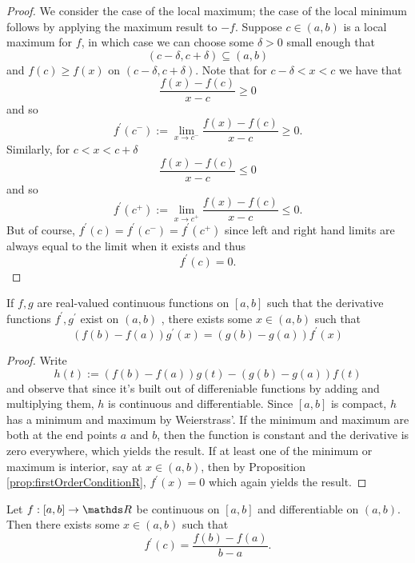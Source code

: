 \begin{proof}
We consider the case of the local maximum; the case of the local minimum
follows by applying the maximum result to $-f.$ Suppose $c\in\left(a,b\right)$
is a local maximum for $f$, in which case we can choose some $\delta>0$
small enough that 
\[
\left(c-\delta,c+\delta\right)\subseteq\left(a,b\right)
\]
and $f\left(c\right)\geq f\left(x\right)$ on $\left(c-\delta,c+\delta\right).$
Note that for $c-\delta<x<c$ we have that 
\[
\frac{f\left(x\right)-f\left(c\right)}{x-c}\geq0
\]
and so 
\[
f^{\prime}\left(c^{-}\right):=\lim_{x\to c^{-}}\frac{f\left(x\right)-f\left(c\right)}{x-c}\geq0.
\]
Similarly, for $c<x<c+\delta$
\[
\frac{f\left(x\right)-f\left(c\right)}{x-c}\leq0
\]
and so 
\[
f^{\prime}\left(c^{+}\right):=\lim_{x\to c^{+}}\frac{f\left(x\right)-f\left(c\right)}{x-c}\leq0.
\]
But of course, $f^{\prime}\left(c\right)=f^{\prime}\left(c^{-}\right)=f^{\prime}\left(c^{+}\right)$
since left and right hand limits are always equal to the limit when
it exists and thus 
\[
f^{\prime}\left(c\right)=0.
\]
\end{proof}
\begin{thm}
\label{thm:cauchyMeanValue}If $f,g$ are real-valued continuous
functions on $\left[a,b\right]$ such that the derivative functions
$f^{\prime},g^{\prime}$ exist on $\left(a,b\right)$ , there exists
some $x\in\left(a,b\right)$ such that 
\[
\left(f\left(b\right)-f\left(a\right)\right)g^{\prime}\left(x\right)=\left(g\left(b\right)-g\left(a\right)\right)f^{\prime}\left(x\right)
\]
\end{thm}

\begin{proof}
Write 
\[
h\left(t\right):=\left(f\left(b\right)-f\left(a\right)\right)g\left(t\right)-\left(g\left(b\right)-g\left(a\right)\right)f\left(t\right)
\]
and observe that since it's built out of differeniable functions by
adding and multiplying them, $h$ is continuous and differentiable.
Since $\left[a,b\right]$ is compact, $h$ has a minimum and maximum
by Weierstrass'. If the minimum and maximum are both at the end points
$a$ and $b$, then the function is constant and the derivative is
zero everywhere, which yields the result. If at least one of the minimum
or maximum is interior, say at $x\in\left(a,b\right)$, then by Proposition
\ref{prop:firstOrderConditionR}, $f^{\prime}\left(x\right)=0$ which
again yields the result.
\end{proof}
\begin{cor}
\label{cor:meanValueThm}Let $f:\left[a,b\right]\to\R$ be continuous
on $\left[a,b\right]$ and differentiable on $\left(a,b\right).$
Then there exists some $x\in\left(a,b\right)$ such that
\[
f^{\prime}\left(c\right)=\frac{f\left(b\right)-f\left(a\right)}{b-a}.
\]
\end{cor}

